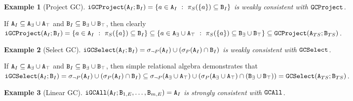 \documentclass{article}
\numberwithin{equation}{section}
\newtheorem{example}{Example}[section]
\renewcommand{\tt}[1]{\ifmmode\text{\texttt{#1}}\else\texttt{#1}\fi}
\begin{document}
\begin{example}[Project GC]
$\tt{iGCProject}(\tt{A}_I; \tt{B}_I) = \{a \in \tt{A}_I ~:~ \pi_S(\{a\}) \subseteq \tt{B}_I\}$ is weakly consistent with $\tt{GCProject}$.
\end{example}

If $\tt{A}_I \subseteq \tt{A}_\exists \cup \tt{A}_\top$ and $\tt{B}_I \subseteq \tt{B}_\exists \cup \tt{B}_\top$, then
clearly $\tt{iGCProject}(\tt{A}_I; \tt{B}_I) = \{a \in \tt{A}_I ~:~ \pi_S(\{a\}) \subseteq \tt{B}_I\} \subseteq \{a \in \tt{A}_\exists \cup \tt{A}_\top ~:~ \pi_S(\{a\}) \subseteq \tt{B}_\exists \cup \tt{B}_\top\} \subseteq \tt{GCProject}(\tt{A}_{TS}; \tt{B}_{TS})$.

\begin{example}[Select GC]
$\tt{iGCSelect}(\tt{A}_I; \tt{B}_I) = \sigma_{\neg P}(\tt{A}_I) \cup (\sigma_P(\tt{A}_I) \cap \tt{B}_I)$ is weakly consistent with $\tt{GCSelect}$.
\end{example}
If $\tt{A}_I \subseteq \tt{A}_\exists \cup \tt{A}_\top$ and $\tt{B}_I \subseteq \tt{B}_\exists \cup \tt{B}_\top$, then
simple relational algebra demonstrates that
$\tt{iGCSelect}(\tt{A}_I; \tt{B}_I) = \sigma_{\neg P}(\tt{A}_I) \cup (\sigma_P(\tt{A}_I) \cap \tt{B}_I) \subseteq \sigma_{\neg P}(\tt{A}_\exists \cup \tt{A}_\top) \cup (\sigma_P(\tt{A}_\exists \cup \tt{A}_\top) \cap (\tt{B}_\exists \cup \tt{B}_\top)) = \tt{GCSelect}(\tt{A}_{TS}; \tt{B}_{TS})$.

\begin{example}[Linear GC]
$\tt{iGCAll}(\tt{A}_I; \tt{B}_{1,E}, \dots, \tt{B}_{m,E}) = \tt{A}_I$ is strongly consistent with $\tt{GCAll}$.
\end{example}
\end{document}
